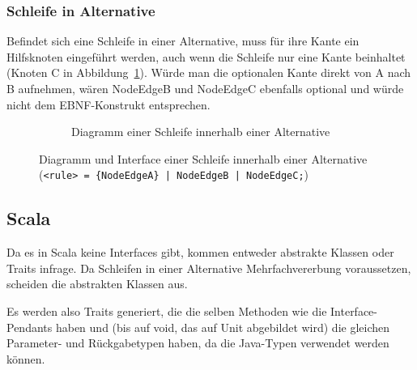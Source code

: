 \documentclass[../InterneDSLs.tex]{subfiles}
\begin{document}
\subsubsection{Schleife in Alternative}
Befindet sich eine Schleife in einer Alternative, muss für ihre Kante ein Hilfsknoten eingeführt werden, auch wenn die Schleife nur eine Kante beinhaltet (Knoten C in Abbildung~\ref{FIG:DiagramLoopInAlternative}). Würde man die optionalen Kante direkt von A nach B aufnehmen, wären NodeEdgeB und NodeEdgeC ebenfalls optional und würde nicht dem EBNF-Konstrukt entsprechen.
\begin{figure}[ht]
\centering
  \begin{subfigure}[c]{0.49\textwidth}
    \caption{Diagramm einer Schleife innerhalb einer Alternative}
    \label{FIG:DiagramLoopInAlternative}
  \end{subfigure}
  \begin{subfigure}[c]{0.49\textwidth}
    
  \end{subfigure}
  \caption{Diagramm und Interface einer Schleife innerhalb einer Alternative (\texttt{<rule> = \{NodeEdgeA\} | NodeEdgeB | NodeEdgeC;})}
  \label{FIG:LoopInAlternative}
\end{figure}

\subsection{Scala}
Da es in Scala keine Interfaces gibt, kommen entweder abstrakte Klassen oder Traits infrage. Da Schleifen in einer Alternative Mehrfachvererbung voraussetzen, scheiden die abstrakten Klassen aus.

Es werden also Traits generiert, die die selben Methoden wie die Interface-Pendants haben und (bis auf void, das auf Unit abgebildet wird) die gleichen Parameter- und Rückgabetypen haben, da die Java-Typen verwendet werden können.
\end{document}
